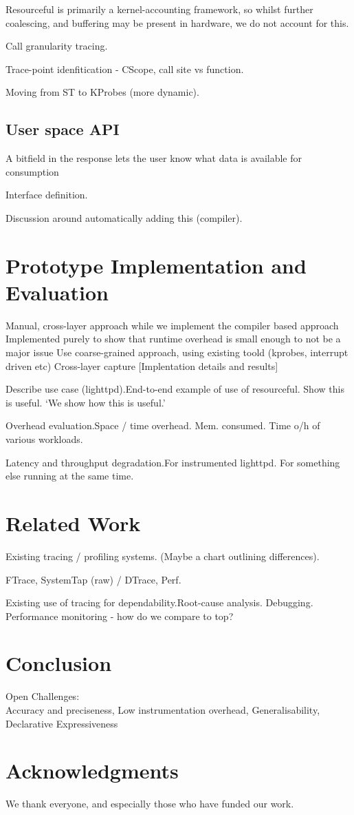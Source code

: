 \documentclass[letterpaper,twocolumn,10pt]{article}
\newcommand{\pname}{Resourceful}
\begin{document}
\pname{ } is primarily a kernel-accounting framework, so whilst further
coalescing, and buffering may be present in hardware, we do not account for
this.


Call granularity tracing.

Trace-point idenfitication - CScope, call site vs function.

Moving from ST to KProbes (more dynamic).

\subsection{User space API} 
A bitfield in the response lets the user know what data is available for consumption

Interface definition.

Discussion around automatically adding this (compiler).

\section{Prototype Implementation and Evaluation} Manual, cross-layer approach
while we implement the compiler based approach Implemented purely to show that
runtime overhead is small enough to not be a major issue Use coarse-grained
approach, using existing toold (kprobes, interrupt driven etc) Cross-layer
capture [Implentation details and results]

Describe use case (lighttpd).\newline End-to-end example of use of resourceful.
Show this is useful. `We show how this is useful.'

Overhead evaluation.\newline Space / time overhead. Mem. consumed. Time o/h of
various workloads.

Latency and throughput degradation.\newline For instrumented lighttpd. For
something else running at the same time.


\section{Related Work} Existing tracing / profiling systems. (Maybe a chart
outlining differences).

FTrace, SystemTap (raw) / DTrace, Perf.

Existing use of tracing for dependability.\newline Root-cause analysis.
Debugging. Performance monitoring - how do we compare to top?

\section{Conclusion} Open Challenges:\\ Accuracy and preciseness, Low
instrumentation overhead, Generalisability, Declarative Expressiveness

\section{Acknowledgments}

We thank everyone, and especially those who have funded our work.

{\footnotesize  }
\end{document}
